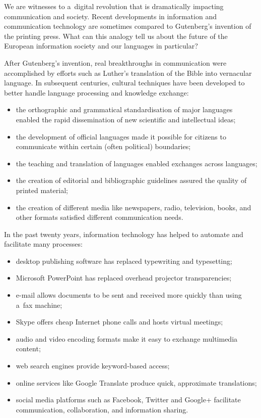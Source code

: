 \begin{multicols}{2} 

We are witnesses to a~digital revolution that is dramatically
impacting communication and society. Recent developments in
information and communication technology are sometimes compared to
Gutenberg’s invention of the printing press. What can this analogy
tell us about the future of the European information society and our
languages in particular? 


After Gutenberg’s invention, real breakthroughs in communication
were accomplished by efforts such as Luther’s translation of the
Bible into vernacular language. In subsequent centuries, cultural
techniques have been developed to better handle language processing
and knowledge exchange: 

\begin{itemize} \item the orthographic and grammatical standardisation
of major languages enabled the rapid dissemination of new scientific
and intellectual ideas; \item the development of official languages
made it possible for citizens to communicate within certain (often
political) boundaries; \item the teaching and translation of languages
enabled exchanges across languages; \item the creation of editorial
and bibliographic guidelines assured the quality of printed material;
\item the creation of different media like newspapers, radio,
television, books, and other formats satisfied different communication
needs. \end{itemize} 

In the past twenty years, information technology has helped to
automate and facilitate many processes: 

\begin{itemize} \item desktop publishing software has replaced
typewriting and typesetting; \item Microsoft PowerPoint has replaced
overhead projector transparencies; \item e-mail allows documents to be
sent and received more quickly than using a~fax machine; \item Skype
offers cheap Internet phone calls and hosts virtual meetings; \item
audio and video encoding formats make it easy to exchange multimedia
content; \item web search engines provide keyword-based access; \item
online services like Google Translate produce quick, approximate
translations; \item social media platforms such as Facebook, Twitter
and Google+ facilitate communication, collaboration, and information
sharing. \end{itemize} 


\end{multicols}
